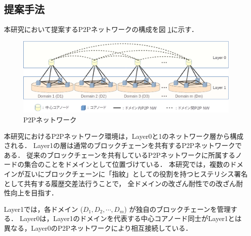 \documentclass[a4paper,12pt]{jsarticle}
\begin{document}
  \subsection{提案手法}
\label{teian}

本研究において提案するP2Pネットワークの構成を図 \ref{fig:p2p}に示す．
%
%
\begin{figure}[H]%
  \begin{center}
    \includegraphics[width=130mm]{pht/p2p_network_image_r1.eps}
  \end{center}
  \caption{P2Pネットワーク}
  \label{fig:p2p}
\end{figure}

本研究におけるP2Pネットワーク環境は，Layer0と1のネットワーク層から構成される．
Layer1の層は通常のブロックチェーンを共有するP2Pネットワークである．
従来のブロックチェーンを共有しているP2Pネットワークに所属するノードの集合のことをドメインとして位置づけている．
本研究では，複数のドメインが互いにブロックチェーンに「指紋」としての役割を持つヒステリシス署名として共有する履歴交差法行うことで，
全ドメインの改ざん耐性での改ざん耐性向上を目指す．

Layer1では，各ドメイン ($D_1, D_2, \cdots, D_m$) が独自のブロックチェーンを管理する．
Layer0は，Layer1のドメインを代表する中心コアノード同士がLayer1とは異なる，Layer0のP2Pネットワークにより相互接続している．
\end{document}
